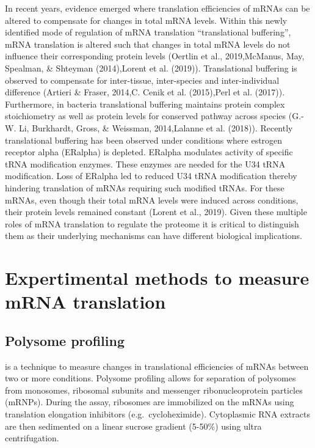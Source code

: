 \documentclass[12pt,openany]{book}
\begin{document}
In recent years, evidence emerged where translation efficiencies of
mRNAs can be altered to compensate for changes in total mRNA levels.
Within this newly identified mode of regulation of mRNA translation
``translational buffering'', mRNA translation is altered such that
changes in total mRNA levels do not influence their corresponding
protein levels (Oertlin et al., 2019,McManus, May, Spealman, \& Shteyman
(2014),Lorent et al. (2019)). Translational buffering is observed to
compensate for inter-tissue, inter-species and inter-individual
difference (Artieri \& Fraser, 2014,C. Cenik et al. (2015),Perl et al.
(2017)). Furthermore, in bacteria translational buffering maintains
protein complex stoichiometry as well as protein levels for conserved
pathway across species (G.-W. Li, Burkhardt, Gross, \& Weissman,
2014,Lalanne et al. (2018)). Recently translational buffering has been
observed under conditions where estrogen receptor alpha (ERalpha) is
depleted. ERalpha modulates activity of specific tRNA modification
enzymes. These enzymes are needed for the U34 tRNA modification. Loss of
ERalpha led to reduced U34 tRNA modification thereby hindering
translation of mRNAs requiring such modified tRNAs. For these mRNAs,
even though their total mRNA levels were induced across conditions,
their protein levels remained constant (Lorent et al., 2019). Given
these multiple roles of mRNA translation to regulate the proteome it is
critical to distinguish them as their underlying mechanisms can have
different biological implications.

\section{Expertimental methods to measure mRNA translation} \label{exptMethod}

\subsection{Polysome profiling}

is a technique to measure changes in translational efficiencies of mRNAs
between two or more conditions. Polysome profiling allows for separation
of polysomes from monosomes, ribosomal subunits and messenger
ribonucleoprotein particles (mRNPs). During the assay, ribosomes are
immobilized on the mRNAs using translation elongation inhibitors
(e.g.~cycloheximide). Cytoplasmic RNA extracts are then sedimented on a
linear sucrose gradient (5-50\%) using ultra centrifugation.
\end{document}
